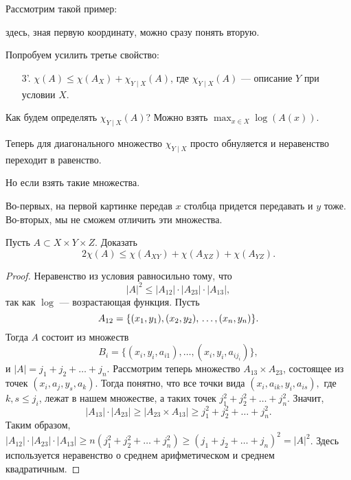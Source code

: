 Рассмотрим такой пример: 
\begin{figure}[ht]
    \centering
    \label{fig:diag-img}
\end{figure}
здесь, зная первую координату, можно сразу понять вторую.

Попробуем усилить третье свойство:
\begin{enumerate}
	\item[3'.] $ \chi(A) \le \chi(A_{X}) + \chi_{Y \mid X} (A)$, где $ \chi _{Y \mid X}(A)$ --- описание $ Y$ при условии $ X$.
\end{enumerate} 
Как будем определять $ \chi_{Y \mid X} (A)$?
Можно взять $ \max_{x \in X} \log(A(x))$.

Теперь для диагонального множество $ \chi_{Y \mid X}$ просто обнуляется и неравенство переходит в равенство.

Но если взять такие множества. 
\begin{figure}[ht]
    \centering
    \label{fig:corner-img}
\end{figure}
Во-первых, на первой картинке передав $ x$ столбца придется передавать  и $ y$ тоже. Во-вторых, мы не сможем отличить эти множества.
\begin{prac}
	Пусть $ A \subset X \times Y \times Z$.
	Доказать
	\[
		2 \chi(A) \le \chi(A_{XY}) + \chi(A_{XZ}) + \chi(A_{YZ})
	.\] 
\end{prac}
\begin{proof}
    Неравенство из условия равносильно тому, что 
    $$ |A|^2 \leq |A_{12}|\cdot |A_{23}|\cdot|A_{13}|, $$ 
    так как $\log$ --- возрастающая функция. Пусть 
    $$ A_{12} = \{(x_1,y_1),(x_2,y_2),\\ \ldots,(x_n,y_n)\}. $$ 
    Тогда $ A $ 
    состоит из множеств 
    $$ B_i = \{(x_i,y_i,a_{i1}),\ldots,(x_i,y_i,a_{ij_i})\}, $$ 
    и $|A| = j_1 + j_2 + \dots + j_n$. Рассмотрим теперь множество $A_{13}\times A_{23}$, состоящее из точек $(x_i,a_j,y_s,a_k)$. Тогда понятно, что все точки вида $(x_i,a_{ik},y_i,a_{is}), $ где $ k,s \leq j_i $, лежат в нашем множестве, а таких точек $j_1^2+j_2^2+\dots+j_n^2$. Значит, 
    $$ |A_{13}|\cdot|A_{23}| \geq |A_{23}\times A_{13}| \geq j_1^2+j_2^2+\ldots+j_n^2. $$ 
    Таким образом, $|A_{12}|\cdot |A_{23}|\cdot|A_{13}| \geq n(j_1^2+j_2^2+\dots+j_n^2) \geq (j_1 + j_2 + \dots + j_n)^2 = |A|^2$.
    Здесь используется неравенство о среднем арифметическом и среднем квадратичным.
\end{proof}

